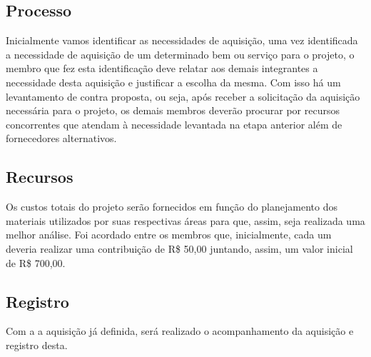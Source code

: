 \subsection{Processo}

Inicialmente vamos identificar as necessidades de aquisição, uma vez identificada a necessidade de aquisição de um determinado bem ou serviço para o projeto, o membro que fez esta identificação deve relatar aos demais integrantes a necessidade desta aquisição e justificar a escolha da mesma. Com isso há um levantamento de contra proposta, ou seja, após receber a solicitação da aquisição necessária para o projeto, os demais membros deverão procurar por recursos concorrentes que atendam à necessidade levantada na etapa anterior além de fornecedores alternativos.


\subsection{Recursos}

Os custos totais do projeto serão fornecidos em função do planejamento dos materiais utilizados por suas respectivas áreas para que, assim, seja realizada uma melhor análise. Foi acordado entre os membros que, inicialmente, cada um deveria realizar uma contribuição de R\$ 50,00 juntando, assim, um valor inicial de R\$ 700,00.

\subsection{Registro}
\label{subsec:Registro}

Com a a aquisição já definida, será realizado o acompanhamento da aquisição e registro desta.

